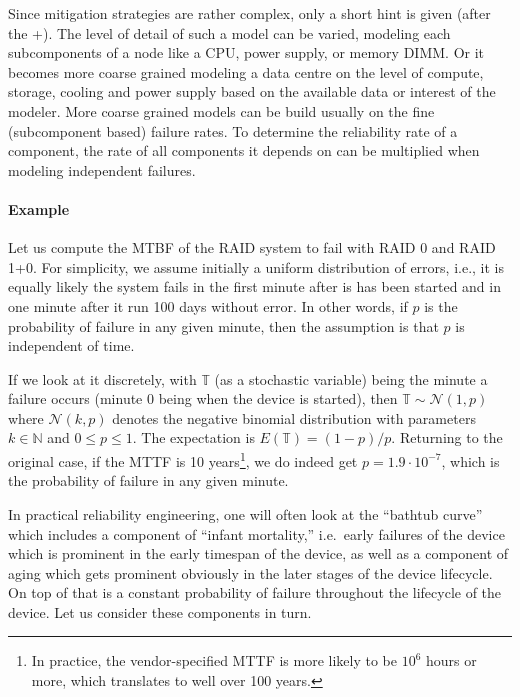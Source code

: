 \documentclass{../../template/esiwace-report}
\begin{document}
Since mitigation strategies are rather complex, only a short hint is given (after the +).
The level of detail of such a model can be varied, modeling each subcomponents of a node like a CPU, power supply, or memory DIMM.
Or it becomes more coarse grained modeling a data centre on the level of compute, storage, cooling and power supply based on the available data or interest of the modeler.
More coarse grained models can be build usually on the fine (subcomponent based) failure rates.
To determine the reliability rate of a component, the rate of all components it depends on can be multiplied when modeling independent failures.

\paragraph{Example}
Let us compute the MTBF of the RAID system to fail with RAID 0 and RAID 1+0.  For simplicity, we assume initially a
uniform distribution of errors, i.e., it is equally likely the system fails in the first minute after is has been
started and in one minute after it run 100 days without error.  In other words, if $p$ is the probability of failure in
any given minute, then the assumption is that $p$ is independent of time.

If we look at it discretely, with $\mathbb{T}$ (as a stochastic variable) being the minute a failure occurs (minute 0
being when the device is started), then $\mathbb{T}\sim\mathcal{N}(1,p)$ where $\mathcal{N}(k,p)$ denotes the negative
binomial distribution with parameters $k\in\mathbb{N}$ and $0\leq p\leq 1$.  The expectation is $E(\mathbb{T})=(1-p)/p$.
Returning to the original case, if the MTTF is 10 years\footnote{In practice, the vendor-specified MTTF is more likely
  to be $10^6$ hours or more, which translates to well over 100 years.}, we do indeed get $p=1.9\cdot 10^{-7}$, which is
the probability of failure in any given minute.

In practical reliability engineering, one will often look at the ``bathtub curve'' which includes a component of
``infant mortality,'' i.e.\ early failures of the device which is prominent in the early timespan of the device, as well
as a component of aging which gets prominent obviously in the later stages of the device lifecycle.  On top of that is a
constant probability of failure throughout the lifecycle of the device.  Let us consider these components in turn.
\end{document}

